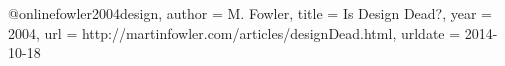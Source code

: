@online{fowler2004design,
  author = {M. Fowler},
  title = {Is Design Dead?},
  year = 2004,
  url = {http://martinfowler.com/articles/designDead.html},
  urldate = {2014-10-18}
}
